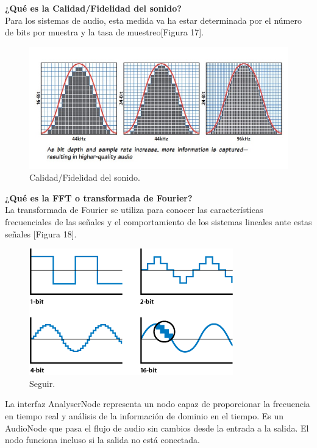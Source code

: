 \noindent\textbf{¿Qué es la Calidad/Fidelidad del sonido?}\\
Para los sistemas de audio, esta medida va ha estar determinada por el número de bits por muestra y la tasa de muestreo[Figura 17].\\

 \begin{figure}[h]
 \centering
 \includegraphics[scale=0.6]{../images/fidelidad_sonido.png}
 \caption{Calidad/Fidelidad del sonido.}
 \label{fig:../images/fidelidad_sonido.png}
 \end{figure}

\noindent\textbf{¿Qué es la FFT o transformada de Fourier?}\\
La transformada de Fourier se utiliza para conocer las características frecuenciales de las señales y el comportamiento de los sistemas lineales ante estas señales [Figura 18].\\

 \begin{figure}[h]
 \centering
 \includegraphics[scale=0.6]{../images/fouries.png}
 \caption{Seguir.}
 \label{fig:../images/fouries.png}
 \end{figure}

La interfaz AnalyserNode representa un nodo capaz de proporcionar la frecuencia en tiempo real y análisis de la información de dominio en el tiempo. Es un AudioNode que pasa el flujo de audio sin cambios desde la entrada a la salida. El nodo funciona incluso si la salida no está conectada.

